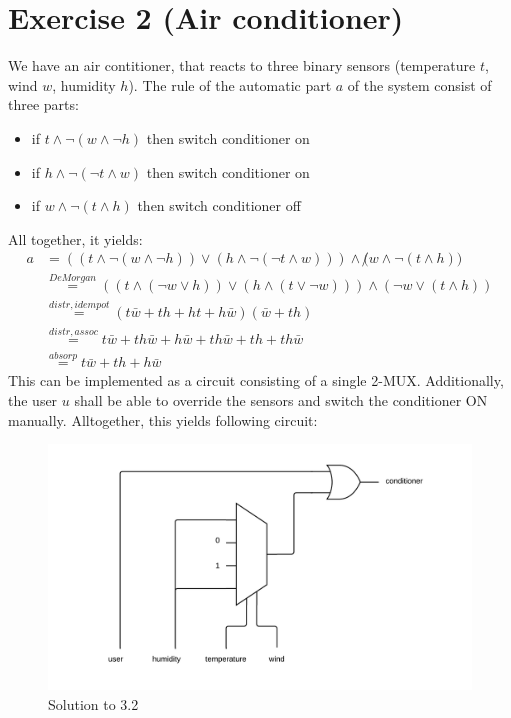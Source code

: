 \documentclass[10pt,a4paper]{scrartcl}
\begin{document}
\section*{Exercise 2 (Air conditioner)}
We have an air contitioner, that reacts to three binary sensors (temperature $t$, wind $w$, humidity $h$).
The rule of the automatic part $a$ of the system consist of three parts:
\begin{itemize}
  \item if $t \wedge \neg (w \wedge \neg h)$ then switch conditioner on
  \item if $h \wedge \neg (\neg t \wedge w)$ then switch conditioner on
  \item if $w \wedge \neg (t \wedge h)$ then switch conditioner off
\end{itemize}
All together, it yields:
\begin{align*}
a &= 
  ((t \wedge \neg (w \wedge \neg h)) \vee (h \wedge \neg (\neg t \wedge w))) 
  \wedge 
  \not (w \wedge \neg (t \wedge h)) \\
  &\overset{De Morgan}=
  ((t \wedge (\neg w \vee h)) \vee (h \wedge (t \vee \neg w))) \wedge (\neg w \vee (t \wedge h)) \\
  &\overset{distr, idempot}=
  (t\bar w + th + ht + h \bar w)(\bar w + th) \\
  &\overset{distr, assoc}=
  t\bar w + th\bar w + h\bar w + th\bar w + th + th \bar w \\
  &\overset{absorp}=
  t\bar w + th + h\bar w
\end{align*}
This can be implemented as a circuit consisting of a single 2-MUX.
Additionally, the user $u$ shall be able to override the sensors and switch the conditioner ON manually.
Alltogether, this yields following circuit:
\vspace{1em}
\begin{figure}[h]
  \centering\includegraphics[width=\linewidth]{images/conditioner.png}
  \caption{Solution to 3.2}
\end{figure}
\vspace{1em}
\end{document}
